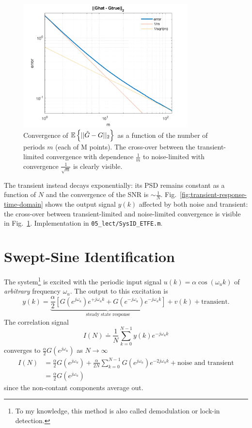 \begin{figure}[h]
  \centering
  \includegraphics[width=0.8\textwidth]{"05_lect/transient-noise-convergence-avg.png"}
  \caption{Convergence of $\mathbb{E}\left\{||\hat{G}-G||_2\right\}$ as a function of the number of periods $m$ (each of M points). The cross-over between the transient-limited convergence with dependence $\frac{1}{m}$ to noise-limited with convergence $\frac{1}{\sqrt{m}}$ is clearly visible.}
  \label{fig:transient-response-convergence}
\end{figure}

The transient instead decays exponentially: its PSD remains constant as a function of $N$ and the convergence of the SNR is $\sim\frac{1}{N}$. Fig.~\ref{fig:transient-response-time-domain} shows the output signal $y(k)$ affected by both noise and transient: the cross-over between transient-limited and noise-limited convergence is visible in Fig.~\ref{fig:transient-response-convergence}. Implementation in \texttt{05\_lect/SysID\_ETFE.m}.


\section{Swept-Sine Identification}
\label{sec:swept-sine-identification}

The system\footnote{To my knowledge, this method is also called demodulation or lock-in detection.} is excited with the periodic input signal $u(k)=\alpha \cos(\omega_uk)$ of \emph{arbitrary} frequency $\omega_u$. The output to this excitation is
\begin{equation*}
  y(k) = \underbrace{\frac{\alpha}{2} \left[G(e^{j\omega_u})e^{+j\omega_uk} + G(e^{-j\omega_u})e^{-j\omega_uk}\right]}_\text{steady state response} + v(k) + \text{transient}.
\end{equation*}
The correlation signal
\begin{equation*}
  I(N) \doteq \frac{1}{N}\sum_{k=0}^{N-1}y(k)e^{-j\omega_u k}
\end{equation*}
converges to $\frac{\alpha}{2}G(e^{j\omega_u})$ as $N\rightarrow \infty$
\begin{align*}
  I(N) &= \frac{\alpha}{2} G(e^{j\omega_u}) + \frac{\alpha}{2N} \sum_{k=0}^{N-1} G(e^{j\omega_u})e^{-2j\omega_u k} + \text{noise and transient} \\
       &= \frac{\alpha}{2} G(e^{j\omega_u})
\end{align*}
since the non-contant components average out.


